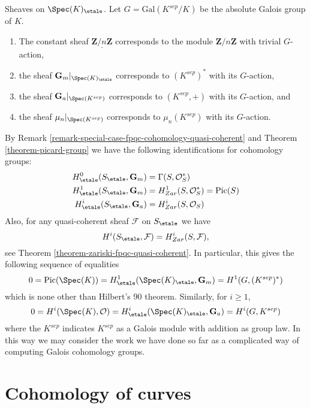 \begin{example}
\label{example-sheaves-point}
Sheaves on $\Spec(K)_\etale$.
Let $G = \text{Gal}(K^{sep}/K)$ be the absolute Galois group of $K$.
\begin{enumerate}
\item The constant sheaf $\underline{\mathbf{Z}/n\mathbf{Z}}$ corresponds to
the module $\mathbf{Z}/n\mathbf{Z}$ with trivial $G$-action,
\item the sheaf $\mathbf{G}_m|_{\Spec(K)_\etale}$ corresponds to
$(K^{sep})^*$ with its $G$-action,
\item the sheaf $\mathbf{G}_a|_{\Spec(K^{sep})}$ corresponds to
$(K^{sep}, +)$ with its $G$-action, and
\item the sheaf $\mu_n|_{\Spec(K^{sep})}$ corresponds to
$\mu_n(K^{sep})$ with its $G$-action.
\end{enumerate}
By
Remark \ref{remark-special-case-fpqc-cohomology-quasi-coherent}
and
Theorem \ref{theorem-picard-group}
we have the following identifications for cohomology groups:
\begin{align*}
H_\etale^0(S_\etale, \mathbf{G}_m) & =
\Gamma(S, \mathcal{O}_S^*) \\
H_\etale^1(S_\etale, \mathbf{G}_m) & =
H_{Zar}^1(S, \mathcal{O}_S^*) = \text{Pic}(S) \\
H_\etale^i(S_\etale, \mathbf{G}_a) & =
H_{Zar}^i(S, \mathcal{O}_S)
\end{align*}
Also, for any quasi-coherent sheaf $\mathcal{F}$ on $S_\etale$ we have
$$
H^i(S_\etale, \mathcal{F}) = H_{Zar}^i(S, \mathcal{F}),
$$
see
Theorem \ref{theorem-zariski-fpqc-quasi-coherent}.
In particular, this gives the following sequence of equalities
$$
0 =
\text{Pic}(\Spec(K)) =
H_\etale^1(\Spec(K)_\etale, \mathbf{G}_m) =
H^1(G, (K^{sep})^*)
$$
which is none other than Hilbert's 90 theorem. Similarly, for $i \geq 1$,
$$
0 = H^i(\Spec(K), \mathcal{O})
= H_\etale^i(\Spec(K)_\etale, \mathbf{G}_a)
= H^i(G, K^{sep})
$$
where the $K^{sep}$ indicates $K^{sep}$ as a Galois module with addition
as group law. In this way we may consider the work we have done so far as
a complicated way of computing Galois cohomology groups.
\end{example}











\section{Cohomology of curves}
\label{section-cohomology-curves}

